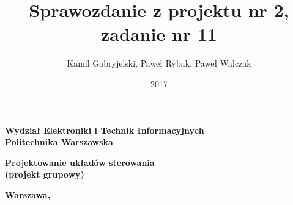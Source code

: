 \documentclass[a4paper,titlepage,11pt,twosides,floatssmall]{mwrep}
\begin{document}
\frenchspacing
\pagestyle{uheadings}

\title{\bf Sprawozdanie z projektu nr 2, zadanie nr 11\vskip 0.1cm}
\author{Kamil Gabryjelski, Paweł Rybak, Paweł Walczak}
\date{2017}

\makeatletter
\renewcommand{\maketitle}{\begin{titlepage}
\begin{center}{\LARGE {\bf
Wydział Elektroniki i Technik Informacyjnych}}\\
\vspace{0.4cm}
{\LARGE {\bf Politechnika Warszawska}}\\
\vspace{0.3cm}
\end{center}
\vspace{5cm}
\begin{center}
{\bf \LARGE Projektowanie układów sterowania\\ (projekt grupowy) \vskip 0.1cm}
\end{center}
\vspace{1cm}
\begin{center}
{\bf \LARGE \@title}
\end{center}
\vspace{2cm}
\begin{center}
{\bf \Large \@author \par}
\end{center}
\vspace*{\stretch{6}}
\begin{center}
\bf{\large{Warszawa, \@date\vskip 0.1cm}}
\end{center}
\end{titlepage}
}
\makeatother

\maketitle

\tableofcontents


%
%
%
%
% 
% 
\end{document}
